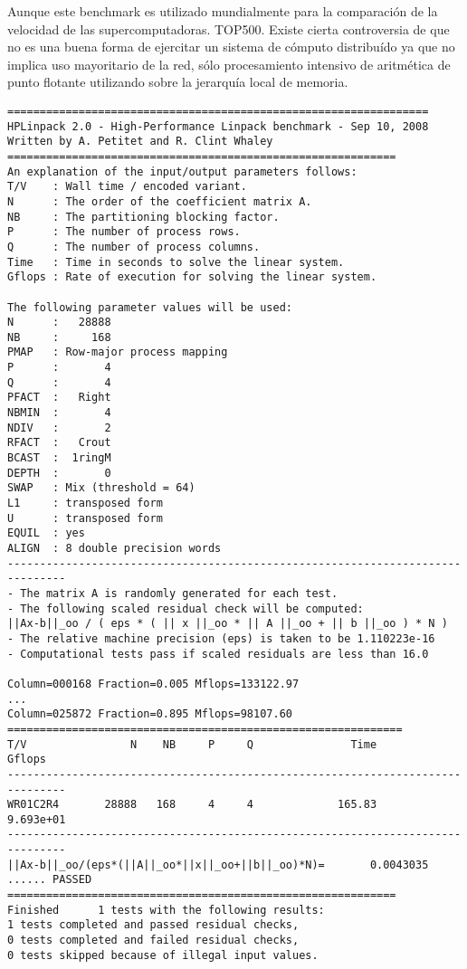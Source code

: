 \documentclass[a4paper]{report}
\begin{document}
\bigskip

Aunque este benchmark es utilizado mundialmente para la comparaci\'on de la
velocidad de las supercomputadoras. TOP500. Existe cierta controversia de que
no es una buena forma de ejercitar un sistema de c\'omputo distribu\'ido ya
que no implica uso mayoritario de la red, s\'olo procesamiento intensivo de
aritm\'etica de punto flotante utilizando sobre la jerarqu\'ia local de
memoria.

\begin{verbatim}
=================================================================
HPLinpack 2.0 - High-Performance Linpack benchmark - Sep 10, 2008
Written by A. Petitet and R. Clint Whaley
============================================================
An explanation of the input/output parameters follows:
T/V    : Wall time / encoded variant.
N      : The order of the coefficient matrix A.
NB     : The partitioning blocking factor.
P      : The number of process rows.
Q      : The number of process columns.
Time   : Time in seconds to solve the linear system.
Gflops : Rate of execution for solving the linear system.

The following parameter values will be used:
N      :   28888
NB     :     168
PMAP   : Row-major process mapping
P      :       4
Q      :       4
PFACT  :   Right
NBMIN  :       4
NDIV   :       2
RFACT  :   Crout
BCAST  :  1ringM
DEPTH  :       0
SWAP   : Mix (threshold = 64)
L1     : transposed form
U      : transposed form
EQUIL  : yes
ALIGN  : 8 double precision words
-------------------------------------------------------------------------------
- The matrix A is randomly generated for each test.
- The following scaled residual check will be computed:
||Ax-b||_oo / ( eps * ( || x ||_oo * || A ||_oo + || b ||_oo ) * N )
- The relative machine precision (eps) is taken to be 1.110223e-16
- Computational tests pass if scaled residuals are less than 16.0

Column=000168 Fraction=0.005 Mflops=133122.97
...
Column=025872 Fraction=0.895 Mflops=98107.60
=============================================================
T/V                N    NB     P     Q               Time                Gflops
-------------------------------------------------------------------------------
WR01C2R4       28888   168     4     4             165.83             9.693e+01
-------------------------------------------------------------------------------
||Ax-b||_oo/(eps*(||A||_oo*||x||_oo+||b||_oo)*N)=       0.0043035 ...... PASSED
============================================================
Finished      1 tests with the following results:
1 tests completed and passed residual checks,
0 tests completed and failed residual checks,
0 tests skipped because of illegal input values.
\end{verbatim}
\end{document}

